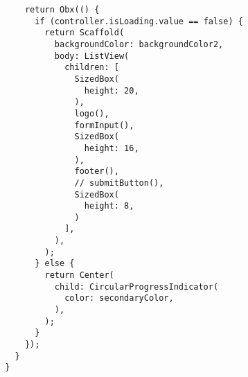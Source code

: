 \begin{lstlisting}
            return Obx(() {
              if (controller.isLoading.value == false) {
                return Scaffold(
                  backgroundColor: backgroundColor2,
                  body: ListView(
                    children: [
                      SizedBox(
                        height: 20,
                      ),
                      logo(),
                      formInput(),
                      SizedBox(
                        height: 16,
                      ),
                      footer(),
                      // submitButton(),
                      SizedBox(
                        height: 8,
                      )
                    ],
                  ),
                );
              } else {
                return Center(
                  child: CircularProgressIndicator(
                    color: secondaryColor,
                  ),
                );
              }
            });
          }
        }          
	\end{lstlisting}
	

